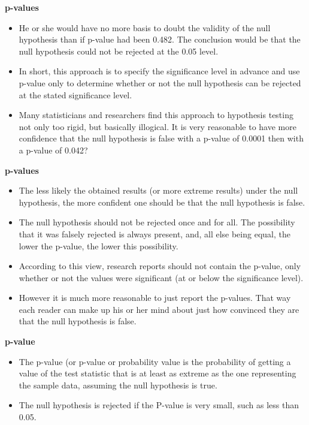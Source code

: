 
\noindent \textbf{p-values}
\begin{itemize}
\item He or she would have no more basis to doubt the validity of the null hypothesis than if p-value had been 0.482. The conclusion would be that the null hypothesis could not be rejected at the 0.05 level. \item In short, this approach is to specify the significance level in advance and use p-value only to determine whether or not the null hypothesis can be rejected at the stated significance level.
\item
Many statisticians and researchers find this approach to hypothesis testing not only too rigid, but basically illogical. It is very reasonable to  have more confidence that the null hypothesis is false with a p-value of 0.0001 then with a p-value of 0.042?
\end{itemize}




\noindent \textbf{p-values}
\begin{itemize}
\item The less likely the obtained results (or more extreme results) under the null hypothesis, the more confident one should be that the null hypothesis is false. \item The null hypothesis should not be rejected once and for all. The possibility that it was falsely rejected is always present, and, all else being equal, the lower the p-value, the lower this possibility.
\item According to this view, research reports should not contain the p-value, only whether or not the values were significant (at or below the significance level).
\item
However it is much more reasonable to just report the p-values. That way each reader can make up his or her mind about just how convinced they are that the null hypothesis is false.
\end{itemize}



{
\noindent \textbf{p-value}
\begin{itemize}
\item The p-value (or p-value or probability value is the probability of getting a value of the test statistic that is at least as extreme as the one representing the sample data, assuming the null hypothesis is true.
\item The null hypothesis is rejected if the P-value is very small, such as less than 0.05.
\end{itemize}
}







